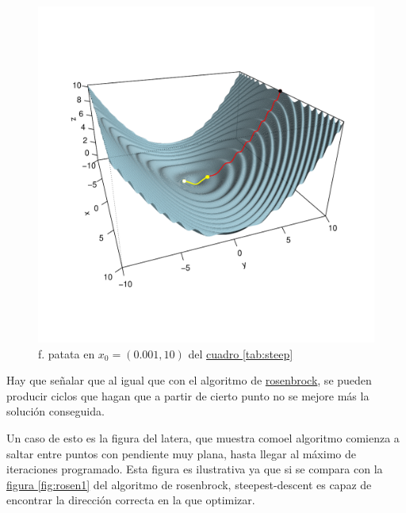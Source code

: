 \begin{figure}
\vspace{-5.3em}%
\hfill%
\hspace{-6ex}\includegraphics[width=0.9\linewidth]{../graphs/patata_func/steep/steep.pdf}
\hfill\hbox{}
\vspace{-3.5em}
\caption{\small f. patata en $x_0=(0.001,10)$ del \hyperref[tab:steep]{cuadro \ref*{tab:steep}}} \label{fig:steep2}
\vspace{-4.5em}
\end{figure}


Hay que señalar que al igual que con el algoritmo de \hyperref[sub:alg-rosen]{rosenbrock}, se pueden producir ciclos que hagan que a partir de cierto punto no se mejore más la solución conseguida.

Un caso de esto es la figura del latera, que muestra comoel algoritmo comienza a saltar entre puntos con pendiente muy plana, hasta llegar al máximo de iteraciones programado. Esta figura es ilustrativa ya que si se compara con la \hyperref[fig:rosen1]{figura \ref*{fig:rosen1}} del algoritmo de rosenbrock, steepest-descent es capaz de encontrar la dirección correcta en la que optimizar.